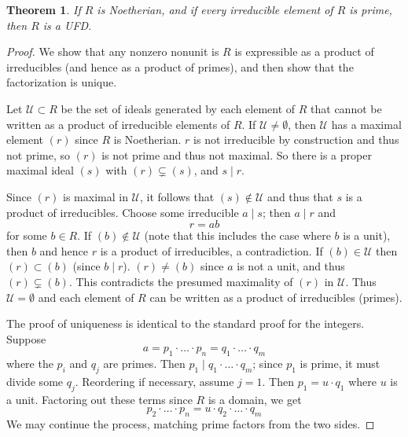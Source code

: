 \documentclass[12pt]{article}
\newtheorem{thm}{Theorem}
\theoremstyle{definition}
\begin{document}
\begin{thm} If $R$ is Noetherian, and if every irreducible element of $R$ is prime, then $R$ is a UFD.
\end{thm}

\begin{proof} We show that any nonzero nonunit is $R$ is expressible as a product of irreducibles (and hence as a product of primes), and then show that the factorization is unique.

Let $\mathcal{U}\subset R$ be the set of ideals generated by each element of $R$ that cannot be written as a product of irreducible elements of $R$. If $\mathcal{U}\neq\emptyset$, then $\mathcal{U}$ has a maximal element $(r)$ since $R$ is Noetherian. $r$ is not irreducible by construction and thus not prime, so $(r)$ is not prime and thus not maximal. So there is a proper maximal ideal $(s)$ with $(r)\subsetneq (s)$, and $s\mid r$.

Since $(r)$ is maximal in $\mathcal{U}$, it follows that $(s)\notin \mathcal{U}$ and thus that $s$ is a product of irreducibles. Choose some irreducible $a\mid s$; then $a\mid r$ and
\[r=ab\]
for some $b\in R$. If $(b)\notin \mathcal{U}$ (note that this includes the case where $b$ is a unit), then $b$ and hence $r$ is a product of irreducibles, a contradiction. If $(b)\in \mathcal{U}$ then $(r)\subset (b)$ (since $b\mid r$). $(r)\neq (b)$ since $a$ is not a unit, and thus $(r)\subsetneq (b)$. This contradicts the presumed maximality of $(r)$ in $\mathcal{U}$. Thus $\mathcal{U}=\emptyset$ and each element of $R$ can be written as a product of irreducibles (primes).

The proof of uniqueness is identical to the standard proof for the integers. Suppose
\[a = p_1\cdot \ldots \cdot p_n = q_1\cdot \ldots \cdot q_m\]
where the $p_i$ and $q_j$ are primes. Then $p_1\mid q_1\cdot\ldots\cdot q_m$; since $p_1$ is prime, it must divide some $q_j$. Reordering if necessary, assume $j=1$. Then $p_1=u\cdot q_1$ where $u$ is a unit. Factoring out these terms since $R$ is a domain, we get
\[p_2\cdot\ldots\cdot p_n=u\cdot q_2\cdot\ldots\cdot q_m\]
We may continue the process, matching prime factors from the two sides.
\end{proof}
\end{document}
